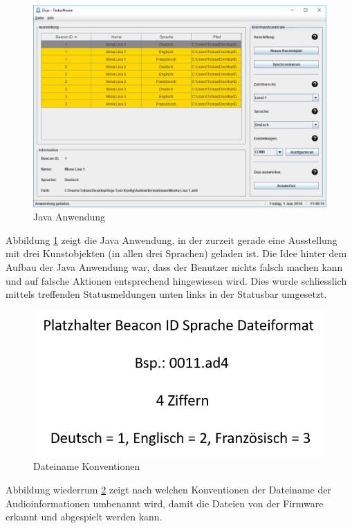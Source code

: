 \begin{figure}[htb]
	\centering
	\includegraphics[width=\textwidth]{graphics/Java_Anwendung.png}
	\caption{Java Anwendung}
	\label{fig:Java Anwendung}
\end{figure}

Abbildung \ref{fig:Java Anwendung} zeigt die Java Anwendung, in der zurzeit gerade eine Ausstellung mit  drei Kunstobjekten (in allen drei Sprachen) geladen ist. Die Idee hinter dem Aufbau der Java Anwendung war, dass der Benutzer nichts falsch machen kann und auf falsche Aktionen entsprechend hingewiesen wird. Dies wurde schliesslich mittels treffenden Statusmeldungen unten links in der Statusbar umgesetzt.

\begin{figure}[htb]
	\centering
	\includegraphics[width=\textwidth]{graphics/Dateiname.png}
	\caption{Dateiname Konventionen}
	\label{fig:Dateiname Konventionen}
\end{figure}

Abbildung wiederrum \ref{fig:Dateiname Konventionen} zeigt nach welchen Konventionen der Dateiname der Audioinformationen umbenannt wird, damit die Dateien von der Firmware erkannt und abgespielt werden kann.
